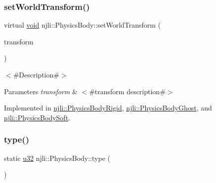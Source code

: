 \mbox{\label{classnjli_1_1_physics_body_a570891a03ea4f8243ccec9202b3dc965}} 
\subsubsection{\texorpdfstring{set\+World\+Transform()}{setWorldTransform()}}
{\footnotesize\ttfamily virtual \mbox{\hyperlink{_thread_8h_af1e856da2e658414cb2456cb6f7ebc66}{void}} njli\+::\+Physics\+Body\+::set\+World\+Transform (\begin{DoxyParamCaption}\item[{const bt\+Transform \&}]{transform }\end{DoxyParamCaption})\hspace{0.3cm}{\ttfamily [pure virtual]}}

$<$\#\+Description\#$>$


\begin{DoxyParams}{Parameters}
{\em transform} & $<$\#transform description\#$>$ \\
\hline
\end{DoxyParams}


Implemented in \mbox{\hyperlink{classnjli_1_1_physics_body_rigid_a70afa1817272e87547d6fccd8ca91ff4}{njli\+::\+Physics\+Body\+Rigid}}, \mbox{\hyperlink{classnjli_1_1_physics_body_ghost_a489d0e67788ff5c74033824814470855}{njli\+::\+Physics\+Body\+Ghost}}, and \mbox{\hyperlink{classnjli_1_1_physics_body_soft_a500a0a1f0e9d729bd0ac23da18202af4}{njli\+::\+Physics\+Body\+Soft}}.

\mbox{\label{classnjli_1_1_physics_body_a98036bcbea6e3269603a83e532d2e5ab}} 
\subsubsection{\texorpdfstring{type()}{type()}}
{\footnotesize\ttfamily static \mbox{\hyperlink{_util_8h_a10e94b422ef0c20dcdec20d31a1f5049}{u32}} njli\+::\+Physics\+Body\+::type (\begin{DoxyParamCaption}{ }\end{DoxyParamCaption})\hspace{0.3cm}{\ttfamily [static]}}

